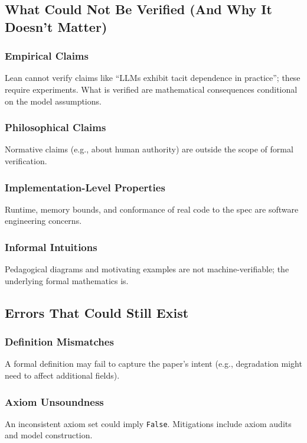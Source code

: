 \subsection{What Could Not Be Verified (And Why It Doesn't Matter)}

\subsubsection{Empirical Claims}
Lean cannot verify claims like ``LLMs exhibit tacit dependence in practice''; these require experiments. What is verified are mathematical consequences conditional on the model assumptions.

\subsubsection{Philosophical Claims}
Normative claims (e.g., about human authority) are outside the scope of formal verification.

\subsubsection{Implementation-Level Properties}
Runtime, memory bounds, and conformance of real code to the spec are software engineering concerns.

\subsubsection{Informal Intuitions}
Pedagogical diagrams and motivating examples are not machine-verifiable; the underlying formal mathematics is.

\subsection{Errors That Could Still Exist}

\subsubsection{Definition Mismatches}
A formal definition may fail to capture the paper's intent (e.g., degradation might need to affect additional fields).

\subsubsection{Axiom Unsoundness}
An inconsistent axiom set could imply \texttt{False}. Mitigations include axiom audits and model construction.

